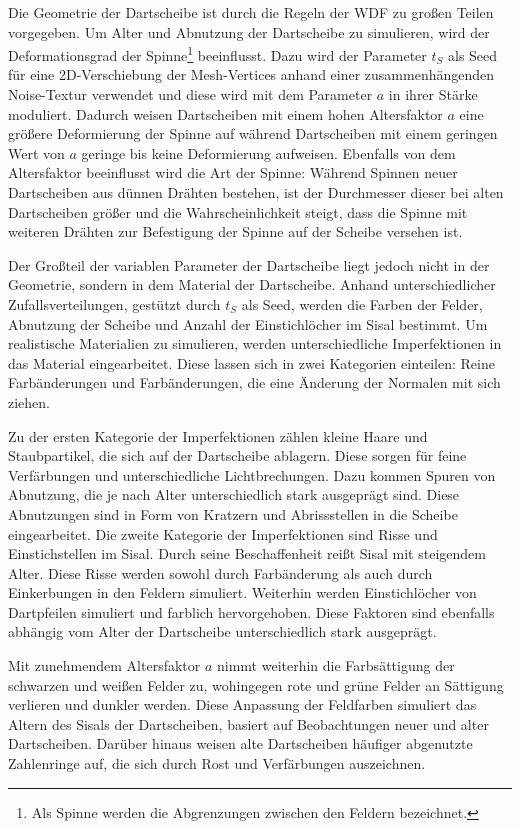 Die Geometrie der Dartscheibe ist durch die Regeln der \ac{WDF} zu großen Teilen vorgegeben. Um Alter und Abnutzung der Dartscheibe zu simulieren, wird der Deformationsgrad der Spinne\footnote{Als Spinne werden die Abgrenzungen zwischen den Feldern bezeichnet.} beeinflusst. Dazu wird der Parameter $t_S$ als Seed für eine 2D-Verschiebung der Mesh-Vertices anhand einer zusammenhängenden Noise-Textur verwendet und diese wird mit dem Parameter $a$ in ihrer Stärke moduliert. Dadurch weisen Dartscheiben mit einem hohen Altersfaktor $a$ eine größere Deformierung der Spinne auf während Dartscheiben mit einem geringen Wert von $a$ geringe bis keine Deformierung aufweisen. Ebenfalls von dem Altersfaktor beeinflusst wird die Art der Spinne: Während Spinnen neuer Dartscheiben aus dünnen Drähten bestehen, ist der Durchmesser dieser bei alten Dartscheiben größer und die Wahrscheinlichkeit steigt, dass die Spinne mit weiteren Drähten zur Befestigung der Spinne auf der Scheibe versehen ist.

Der Großteil der variablen Parameter der Dartscheibe liegt jedoch nicht in der Geometrie, sondern in dem Material der Dartscheibe. Anhand unterschiedlicher Zufallsverteilungen, gestützt durch $t_S$ als Seed, werden die Farben der Felder, Abnutzung der Scheibe und Anzahl der Einstichlöcher im Sisal bestimmt.
Um realistische Materialien zu simulieren, werden unterschiedliche Imperfektionen in das Material eingearbeitet. Diese lassen sich in zwei Kategorien einteilen: Reine Farbänderungen und Farbänderungen, die eine Änderung der Normalen mit sich ziehen.

Zu der ersten Kategorie der Imperfektionen zählen kleine Haare und Staubpartikel, die sich auf der Dartscheibe ablagern. Diese sorgen für feine Verfärbungen und unterschiedliche Lichtbrechungen. Dazu kommen Spuren von Abnutzung, die je nach Alter unterschiedlich stark ausgeprägt sind. Diese Abnutzungen sind in Form von Kratzern und Abrissstellen in die Scheibe eingearbeitet.
Die zweite Kategorie der Imperfektionen sind Risse und Einstichstellen im Sisal. Durch seine Beschaffenheit reißt Sisal mit steigendem Alter. Diese Risse werden sowohl durch Farbänderung als auch durch Einkerbungen in den Feldern simuliert. Weiterhin werden Einstichlöcher von Dartpfeilen simuliert und farblich hervorgehoben. Diese Faktoren sind ebenfalls abhängig vom Alter der Dartscheibe unterschiedlich stark ausgeprägt.

Mit zunehmendem Altersfaktor $a$ nimmt weiterhin die Farbsättigung der schwarzen und weißen Felder zu, wohingegen rote und grüne Felder an Sättigung verlieren und dunkler werden. Diese Anpassung der Feldfarben simuliert das Altern des Sisals der Dartscheiben, basiert auf Beobachtungen neuer und alter Dartscheiben. Darüber hinaus weisen alte Dartscheiben häufiger abgenutzte Zahlenringe auf, die sich durch Rost und Verfärbungen auszeichnen.

